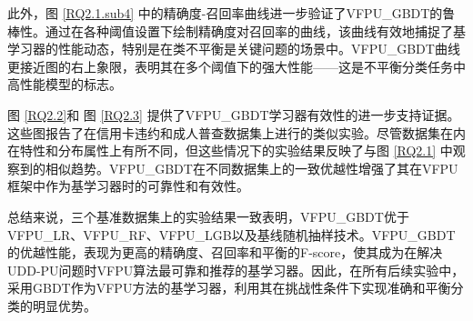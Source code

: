 此外，图 \ref{RQ2.1.sub4} 中的精确度-召回率曲线进一步验证了VFPU\_GBDT的鲁棒性。通过在各种阈值设置下绘制精确度对召回率的曲线，该曲线有效地捕捉了基学习器的性能动态，特别是在类不平衡是关键问题的场景中。VFPU\_GBDT曲线更接近图的右上象限，表明其在多个阈值下的强大性能——这是不平衡分类任务中高性能模型的标志。

图 \ref{RQ2.2}和 图 \ref{RQ2.3} 提供了VFPU\_GBDT学习器有效性的进一步支持证据。这些图报告了在信用卡违约和成人普查数据集上进行的类似实验。尽管数据集在内在特性和分布属性上有所不同，但这些情况下的实验结果反映了与图 \ref{RQ2.1} 中观察到的相似趋势。VFPU\_GBDT在不同数据集上的一致优越性增强了其在VFPU框架中作为基学习器时的可靠性和有效性。

总结来说，三个基准数据集上的实验结果一致表明，VFPU\_GBDT优于VFPU\_LR、VFPU\_RF、VFPU\_LGB以及基线随机抽样技术。VFPU\_GBDT的优越性能，表现为更高的精确度、召回率和平衡的F-score，使其成为在解决UDD-PU问题时VFPU算法最可靠和推荐的基学习器。因此，在所有后续实验中，采用GBDT作为VFPU方法的基学习器，利用其在挑战性条件下实现准确和平衡分类的明显优势。

